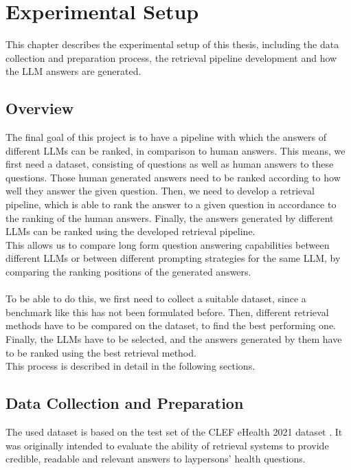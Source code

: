 \chapter{Experimental Setup}
This chapter describes the experimental setup of this thesis, including the data collection and preparation process, the retrieval pipeline development and how the LLM answers are generated.

\section{Overview}\label{sec:overview}
The final goal of this project is to have a pipeline with which the answers of different LLMs can be ranked, in comparison to human answers.
This means, we first need a dataset, consisting of questions as well as human answers to these questions.
Those human generated answers need to be ranked according to how well they answer the given question.
Then, we need to develop a retrieval pipeline, which is able to rank the answer to a given question in accordance to the ranking of the human answers.
Finally, the answers generated by different LLMs can be ranked using the developed retrieval pipeline.
\\
This allows us to compare long form question answering capabilities between different LLMs or between different prompting strategies for the same LLM, by comparing the ranking positions of the generated answers.
\\\\
To be able to do this, we first need to collect a suitable dataset, since a benchmark like this has not been formulated before.
Then, different retrieval methods have to be compared on the dataset, to find the best performing one.
Finally, the LLMs have to be selected, and the answers generated by them have to be ranked using the best retrieval method.
\\
This process is described in detail in the following sections.

\section{Data Collection and Preparation}\label{sec:dataset}
The used dataset is based on the test set of the CLEF eHealth 2021 dataset \cite{goeuriot:2021:Consumer}.
It was originally intended to evaluate the ability of retrieval systems to provide credible, readable and relevant answers to laypersons' health questions.


